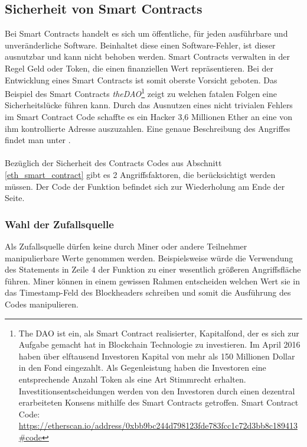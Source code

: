 \subsection{Sicherheit von Smart Contracts}
Bei Smart Contracts handelt es sich um öffentliche, für jeden ausführbare und unveränderliche Software. Beinhaltet diese einen Software-Fehler, ist dieser ausnutzbar und kann nicht behoben werden. Smart Contracts verwalten in der Regel Geld oder Token, die einen finanziellen Wert repräsentieren. Bei der Entwicklung eines Smart Contracts ist somit oberste Vorsicht geboten. Das Beispiel des Smart Contracts \textit{theDAO}\footnote{The DAO ist ein, als Smart Contract realisierter, Kapitalfond, der es sich zur Aufgabe gemacht hat in Blockchain Technologie zu investieren. Im April 2016 haben über elftausend Investoren Kapital von mehr als 150 Millionen Dollar in den Fond eingezahlt. Als Gegenleistung haben die Investoren eine entsprechende Anzahl Token als eine Art Stimmrecht erhalten. Investitionsentscheidungen werden von den Investoren durch einen dezentral erarbeiteten Konsens mithilfe des Smart Contracts getroffen. Smart Contract Code: \url{https://etherscan.io/address/0xbb9bc244d798123fde783fcc1c72d3bb8c189413\#code}} zeigt zu welchen fatalen Folgen eine Sicherheitslücke führen kann. Durch das Ausnutzen eines nicht trivialen Fehlers im Smart Contract Code schaffte es ein Hacker 3,6 Millionen Ether an eine von ihm kontrollierte Adresse auszuzahlen. Eine genaue Beschreibung des Angriffes findet man unter \cite{eth_dao_hack}.\\\\
Bezüglich der Sicherheit des Contracts Codes aus Abschnitt \ref{eth_smart_contract} gibt es 2 Angriffsfaktoren, die berücksichtigt werden müssen. Der Code der  Funktion befindet sich zur Wiederholung am Ende der Seite.


\subsubsection{Wahl der Zufallsquelle}
Als Zufallsquelle dürfen keine durch Miner oder andere Teilnehmer manipulierbare Werte genommen werden. Beispielsweise würde die Verwendung des Statements  in Zeile 4 der  Funktion zu einer wesentlich größeren Angriffsfläche führen. Miner können in einem gewissen Rahmen entscheiden welchen Wert sie in das Timestamp-Feld des Blockheaders schreiben und somit die Ausführung des Codes manipulieren.
